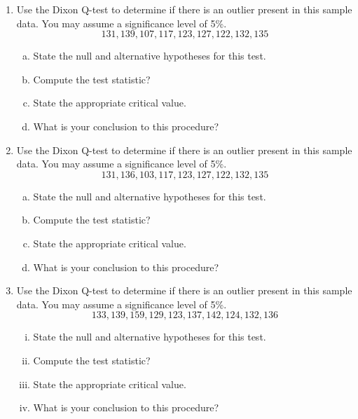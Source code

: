 \documentclass[a4paper,12pt]{article}
\begin{document}
\begin{enumerate}

\item Use the Dixon Q-test to determine if there is an outlier present in this sample data. You may assume
a significance level of 5\%.
\[ 131, 139, 107, 117, 123, 127, 122, 132, 135\]
\begin{enumerate}[(a)]
\item  State the null and alternative hypotheses for this test.
\item  Compute the test statistic?
\item  State the appropriate critical value.
\item  What is your conclusion to this procedure?
\end{enumerate}


\item Use the Dixon Q-test to determine if there is an outlier present in this sample data. You may assume
a significance level of 5\%.
\[ 131, 136, 103, 117, 123, 127, 122, 132, 135\]
\begin{enumerate}[(a)]
\item  State the null and alternative hypotheses for this test.
\item  Compute the test statistic?
\item  State the appropriate critical value.
\item  What is your conclusion to this procedure?
\end{enumerate}




\item Use the Dixon Q-test to determine if there is an outlier present in this sample data. You may assume
a significance level of 5\%.
\[ 133, 139, 159, 129, 123, 
  137, 142, 124, 132, 136\]
\begin{enumerate}[(i)]
\item  State the null and alternative hypotheses for this test.
\item  Compute the test statistic?
\item  State the appropriate critical value.
\item  What is your conclusion to this procedure?
\end{enumerate}
\end{enumerate}
\end{document}
